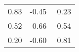 \begin{table}[ht]
\centering
\begin{tabular}{rrr}
  \hline
  \hline
0.83 & -0.45 & 0.23 \\ 
  0.52 & 0.66 & -0.54 \\ 
  0.20 & -0.60 & 0.81 \\ 
   \hline
\end{tabular}
\end{table}
